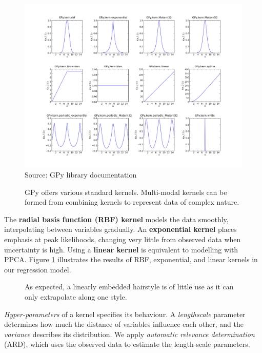 \documentclass[ %
author={Dillon Keith Diep},
supervisor={Dr. Carl Henrik Ek},
degree={MEng},
title={ART-CG:},
subtitle={Assisted Real-time Content Generation of 3D Hair by Learning Manifolds},
type={Research},
year={2017} ]{dissertation}
\begin{document}
\begin{figure}[!h]
	\centering
	\includegraphics[scale=0.3]{images/gpyKernels}\\
	\tiny{Source: GPy library documentation}
	\caption{GPy offers various standard kernels. Multi-modal kernels can be formed from combining kernels to represent data of complex nature.}
\end{figure}

The \textbf{radial basis function (RBF) kernel} models the data smoothly, interpolating between variables gradually. An \textbf{exponential kernel} places emphasis at peak likelihoods, changing very little from observed data when uncertainty is high. Using a \textbf{linear kernel} is equivalent to modelling with PPCA. Figure \ref{kernelHair} illustrates the results of RBF, exponential, and linear kernels in our regression model.

\begin{figure}[!h]
	\centering
	\caption{As expected, a linearly embedded hairstyle is of little use as it can only extrapolate along one style. }
	\label{kernelHair}
\end{figure}


\textit{Hyper-parameters} of a kernel specifies its behaviour. A \textit{lengthscale} parameter determines how much the distance of variables influence each other, and the \textit{variance} describes its distribution. We apply \textit{automatic relevance determination} (ARD), which uses the observed data to estimate the length-scale parameters. 
\end{document}
